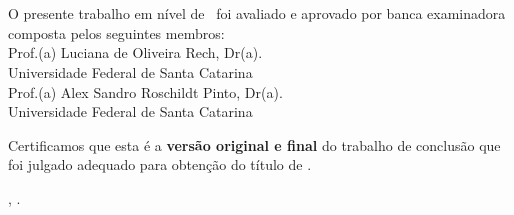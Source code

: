 \imprimircapa

\imprimirfolhaderosto*

\begin{fichacatalografica}

\end{fichacatalografica}

\begin{folhadeaprovacao}
\OnehalfSpacing
\centering
\imprimirautor\\%
\vspace*{10pt}		
\textbf{\imprimirtitulo}%
\ifnotempty{\imprimirsubtitulo}{:~\imprimirsubtitulo}\\%
\vspace*{\baselineskip}
O presente trabalho em nível de \imprimirnivel~foi avaliado e aprovado por banca examinadora composta pelos seguintes membros:\\
\vspace*{\baselineskip}
Prof.(a) Luciana de Oliveira Rech, Dr(a).\\
Universidade Federal de Santa Catarina\\
\vspace*{\baselineskip}
Prof.(a) Alex Sandro Roschildt Pinto, Dr(a).\\
Universidade Federal de Santa Catarina\\
\vspace*{\baselineskip}
\vspace*{2\baselineskip}
\begin{minipage}{\textwidth}
Certificamos que esta é a \textbf{versão original e final} do trabalho de conclusão que foi julgado adequado para obtenção do título de \imprimirformacao.\\
\end{minipage}
\vspace*{\fill}
\vspace*{\fill}
\assinatura{\OnehalfSpacing\imprimirorientador \\ \imprimirorientadorRotulo}
\vspace*{\fill}
\imprimirlocal, \imprimirano.
\end{folhadeaprovacao}

